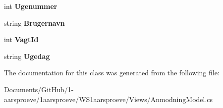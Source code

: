 \begin{DoxyCompactItemize}
\item 
\hypertarget{class_w_s1aarsproeve_1_1_anmodning_model_a700e726b0bca32d1594576033790bd90}{}int {\bfseries Ugenummer}\label{class_w_s1aarsproeve_1_1_anmodning_model_a700e726b0bca32d1594576033790bd90}

\item 
\hypertarget{class_w_s1aarsproeve_1_1_anmodning_model_a6600492060774a2abc4c8572265a9282}{}string {\bfseries Brugernavn}\label{class_w_s1aarsproeve_1_1_anmodning_model_a6600492060774a2abc4c8572265a9282}

\item 
\hypertarget{class_w_s1aarsproeve_1_1_anmodning_model_acee4c34ed3400a9b88aeb960d5dd1432}{}int {\bfseries Vagt\+Id}\label{class_w_s1aarsproeve_1_1_anmodning_model_acee4c34ed3400a9b88aeb960d5dd1432}

\item 
\hypertarget{class_w_s1aarsproeve_1_1_anmodning_model_aa378f60617c0739cd20c65c572231334}{}string {\bfseries Ugedag}\label{class_w_s1aarsproeve_1_1_anmodning_model_aa378f60617c0739cd20c65c572231334}

\end{DoxyCompactItemize}


The documentation for this class was generated from the following file\+:\begin{DoxyCompactItemize}
\item 
Documents/\+Git\+Hub/1-\/aarsproeve/1aarsproeve/\+W\+S1aarsproeve/\+Views/Anmodning\+Model.\+cs\end{DoxyCompactItemize}
